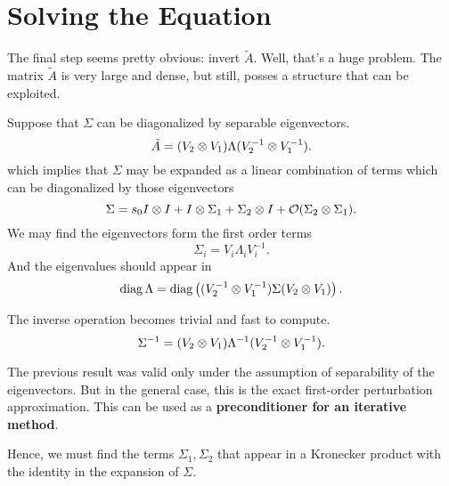 \section{Solving the Equation}

\begin{frame}{The final step seems pretty obvious: invert $\tilde{A}$.}
Well, that's a huge problem. The matrix $\tilde{A}$ is very large and dense, but still, posses a structure that can be exploited.

\end{frame}

\begin{frame}{Suppose that $\Sigma$ can be diagonalized by separable eigenvectors.}
\begin{equation*}
\tilde{A} = (V_2 \otimes V_1) \Lambda (V_2^{-1} \otimes V_1^{-1}).
\end{equation*}
which implies that $\Sigma$ may be expanded as a linear combination of terms which can be diagonalized by those eigenvectors
\begin{equation*}
\Sigma = s_0 I\otimes I + I\otimes \Sigma_1 + \Sigma_2 \otimes I + \mathcal{O}(\Sigma_2\otimes \Sigma_1).
\end{equation*}
We may find the eigenvectors form the first order terms
\begin{equation*}
\Sigma_i=V_i \Lambda_i V_i^{-1}.
\end{equation*}
And the eigenvalues should appear in
\begin{equation*}
\operatorname{diag}{\Lambda} = \operatorname{diag}\left((V_2^{-1} \otimes V_1^{-1}) \Sigma (V_2 \otimes V_1)\right).
\end{equation*}
\end{frame}

\begin{frame}{The inverse operation becomes trivial and fast to compute.}
\begin{equation*}
\Sigma^{-1} = (V_2 \otimes V_1) \Lambda^{-1} (V_2^{-1} \otimes V_1^{-1}).
\end{equation*}

The previous result was valid only under the assumption of separability of the eigenvectors. But in the general case, this is the exact first-order perturbation approximation. This can be used as a \textbf{preconditioner for an iterative method}.

\bigskip
Hence, we must find the terms $\Sigma_1, \Sigma_2$ that appear in a Kronecker product with the identity in the expansion of $\Sigma$. 
\end{frame}
